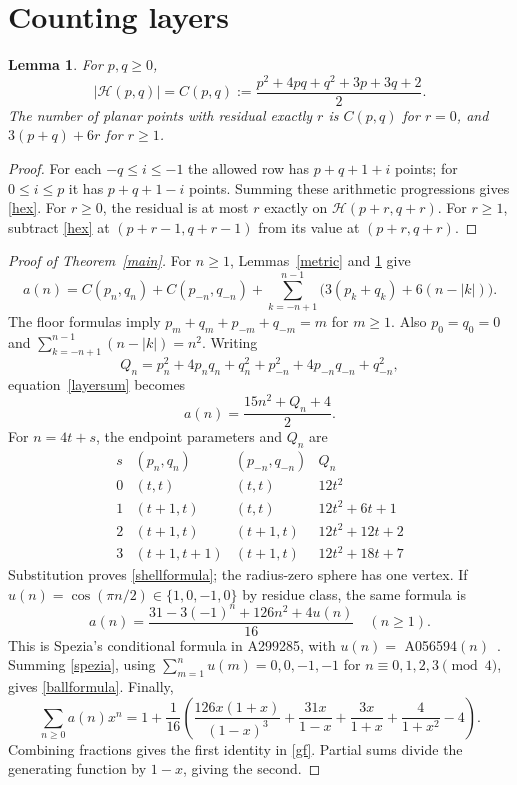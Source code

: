 \documentclass[11pt]{article}
\newtheorem{lemma}[theorem]{Lemma}
\newcommand{\Hh}{\mathcal H}
\begin{document}
\section{Counting layers}
\begin{lemma}\label{hexcount}
For $p,q\ge0$,
\begin{equation}\label{hex}
|\Hh(p,q)|=C(p,q):=\frac{p^2+4pq+q^2+3p+3q+2}{2}.
\end{equation}
The number of planar points with residual exactly $r$ is $C(p,q)$ for
$r=0$, and $3(p+q)+6r$ for $r\ge1$.
\end{lemma}
\begin{proof}
For each $-q\le i\le-1$ the allowed row has $p+q+1+i$ points;
for $0\le i\le p$ it has $p+q+1-i$ points.
Summing these arithmetic progressions gives \eqref{hex}.
For $r\ge0$, the residual is at most $r$ exactly on
$\Hh(p+r,q+r)$. For $r\ge1$, subtract \eqref{hex} at
$(p+r-1,q+r-1)$ from its value at $(p+r,q+r)$.
\end{proof}

\begin{proof}[Proof of Theorem~\ref{main}]
For $n\ge1$, Lemmas~\ref{metric} and \ref{hexcount} give
\begin{equation}\label{layersum}
a(n)=C(p_n,q_n)+C(p_{-n},q_{-n})+
\sum_{k=-n+1}^{n-1}\bigl(3(p_k+q_k)+6(n-|k|)\bigr).
\end{equation}
The floor formulas imply
$p_m+q_m+p_{-m}+q_{-m}=m$ for $m\ge1$.
Also $p_0=q_0=0$ and
$\sum_{k=-n+1}^{n-1}(n-|k|)=n^2$.
Writing
\[
Q_n=p_n^2+4p_nq_n+q_n^2+p_{-n}^2+4p_{-n}q_{-n}+q_{-n}^2,
\]
equation~\eqref{layersum} becomes
\[
a(n)=\frac{15n^2+Q_n+4}{2}.
\]
For $n=4t+s$, the endpoint parameters and $Q_n$ are
\[
\begin{array}{c|c|c|c}
s&(p_n,q_n)&(p_{-n},q_{-n})&Q_n\\\hline
0&(t,t)&(t,t)&12t^2\\
1&(t+1,t)&(t,t)&12t^2+6t+1\\
2&(t+1,t)&(t+1,t)&12t^2+12t+2\\
3&(t+1,t+1)&(t+1,t)&12t^2+18t+7
\end{array}
\]
Substitution proves \eqref{shellformula}; the radius-zero sphere has one
vertex. If $u(n)=\cos(\pi n/2)\in\{1,0,-1,0\}$ by residue class, the
same formula is
\begin{equation}\label{spezia}
a(n)=\frac{31-3(-1)^n+126n^2+4u(n)}{16}\quad(n\ge1).
\end{equation}
This is Spezia's conditional formula in A299285, with $u(n)=$ A056594$(n)$~\cite{periodic}.
Summing \eqref{spezia}, using
$\sum_{m=1}^n u(m)=0,0,-1,-1$ for $n\equiv0,1,2,3\pmod4$,
gives \eqref{ballformula}.
Finally,
\[
\sum_{n\ge0}a(n)x^n=1+\frac1{16}\left(
\frac{126x(1+x)}{(1-x)^3}+\frac{31x}{1-x}
+\frac{3x}{1+x}+\frac4{1+x^2}-4\right).
\]
Combining fractions gives the first identity in \eqref{gf}.
Partial sums divide the generating function by $1-x$, giving the second.
\end{proof}
\end{document}
